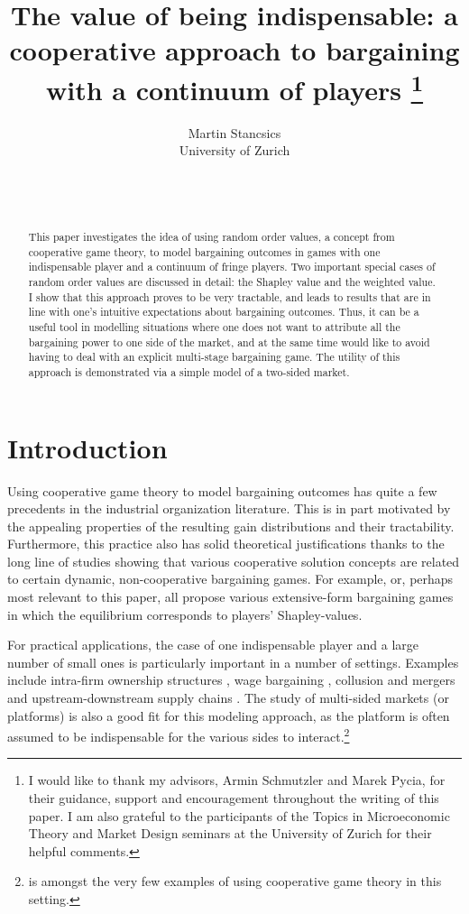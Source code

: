 \documentclass[a4paper]{article}
\title{%
    The value of being indispensable: a cooperative approach to bargaining with a continuum of players%
    \thanks{
        I would like to thank my advisors, Armin Schmutzler and Marek Pycia, for their guidance, support and encouragement throughout the writing of this paper.
        I am also grateful to the participants of the Topics in Microeconomic Theory and Market Design seminars at the University of Zurich for their helpful comments.
    }
}
\author{Martin Stancsics \\ \normalsize{University of Zurich}}
\date{\thisdraft \\ \firstdraft \\ \latestversion}
\begin{document}
\maketitle

\begin{abstract}
    This paper investigates the idea of using random order values, a concept from cooperative game theory, to model bargaining outcomes in games with one indispensable player and a continuum of fringe players.
    Two important special cases of random order values are discussed in detail: the Shapley value and the weighted value.
    I show that this approach proves to be very tractable, and leads to results that are in line with one's intuitive expectations about bargaining outcomes.
    Thus, it can be a useful tool in modelling situations where one does not want to attribute all the bargaining power to one side of the market, and at the same time would like to avoid having to deal with an explicit multi-stage bargaining game.
    The utility of this approach is demonstrated via a simple model of a two-sided market.
\end{abstract}


\section{Introduction}

Using cooperative game theory to model bargaining outcomes has quite a few precedents in the industrial organization literature.
This is in part motivated by the appealing properties of the resulting gain distributions and their tractability.
Furthermore, this practice also has solid theoretical justifications thanks to the long line of studies showing that various cooperative solution concepts are related to certain dynamic, non-cooperative bargaining games.
For example, \textcite{gul1989bargaining,winter1994demand,hart1996bargaining,inderst2003bargaining,} or, perhaps most relevant to this paper, \textcite{stole1996intra} all propose various extensive-form bargaining games in which the equilibrium corresponds to players' Shapley-values.

For practical applications, the case of one indispensable player and a large number of small ones is particularly important in a number of settings.
Examples include intra-firm ownership structures \parencite{hart1990property}, wage bargaining \parencite{stole1996intra,stole1996organizational,levy1997individual}, collusion and mergers \parencite{segal2003collusion} and upstream-downstream supply chains \parencite{inderst2003bargaining,montez2007downstream}.
The study of multi-sided markets (or platforms) is also a good fit for this modeling approach, as the platform is often assumed to be indispensable for the various sides to interact.\footnote{
    \textcite{huang2022shapley} is amongst the very few examples of using cooperative game theory in this setting.
}
\end{document}
